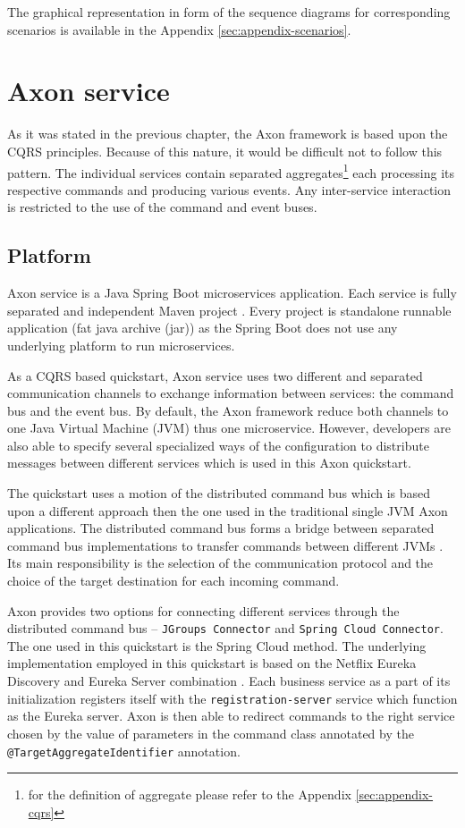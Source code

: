 \documentclass[oneside,
  digital, %
  table,   %
  nolof,     %
  nolot,     %
]{fithesis3}
\begin{document}
The graphical representation in form of the sequence diagrams for corresponding scenarios is available in the Appendix \ref{sec:appendix-scenarios}.

\section{Axon service}

As it was stated in the previous chapter, the Axon framework is based upon the CQRS principles. Because of this nature, it would be difficult not to follow this pattern. The individual services contain separated aggregates\footnote{for the definition of aggregate please refer to the Appendix \ref{sec:appendix-cqrs}} each processing its respective commands and producing various events. Any inter-service interaction is restricted to the use of the command and event buses.

\subsection{Platform}

Axon service is a Java Spring Boot \cite{spring_boot} microservices application. Each service is fully separated and independent Maven  project \cite{maven}. Every project is standalone runnable application (fat java archive (jar)) as the Spring Boot does not use any underlying platform to run microservices.

As a CQRS based quickstart, Axon service uses two different and separated communication channels to exchange information between services: the command bus and the event bus. By default, the Axon framework reduce both channels to one Java Virtual Machine (JVM) thus one microservice. However, developers are also able to specify several specialized ways of the configuration to distribute messages between different services which is used in this Axon quickstart.

The quickstart uses a motion of the distributed command bus which is based upon a different approach then the one used in the traditional single JVM Axon applications. The distributed command bus forms a bridge between separated command bus implementations to transfer commands between different JVMs \cite{axon_framework_reference_guide}. Its main responsibility is the selection of the communication protocol and the choice of the target destination for each incoming command. 

Axon provides two options for connecting different services through the distributed command bus -- \texttt{JGroups Connector} and \texttt{Spring Cloud Connector}. The one used in this quickstart is the Spring Cloud method. The underlying implementation employed in this quickstart is based on the Netflix Eureka Discovery and Eureka Server combination \cite{service_registration}. Each business service as a part of its initialization registers itself with the  \texttt{registration-server} service which function as the Eureka server. Axon is then able to redirect commands to the right service chosen by the value of parameters in the command class annotated by the \texttt{@TargetAggregateIdentifier} annotation.
\end{document}
